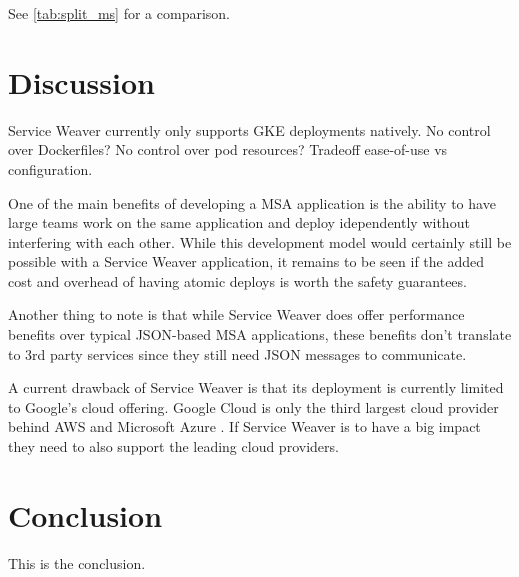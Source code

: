 \documentclass[sigconf,review,9pt]{acmart}
\begin{document}
See \ref{tab:split_ms} for a comparison.

\section{Discussion}
Service Weaver currently only supports GKE deployments natively.
No control over Dockerfiles?
No control over pod resources?
Tradeoff ease-of-use vs configuration.

One of the main benefits of developing a MSA application is the ability to
have large teams work on the same application and deploy idependently without
interfering with each other. \cite{what}
While this development model would certainly still be possible with a Service Weaver
application, it remains to be seen if the added cost and overhead of having atomic
deploys is worth the safety guarantees.

Another thing to note is that while Service Weaver does offer performance benefits
over typical JSON-based MSA applications, these benefits don't translate to 3rd party
services since they still need JSON messages to communicate.

A current drawback of Service Weaver is that its deployment is currently limited to Google's
cloud offering.
Google Cloud is only the third largest cloud provider behind AWS \cite{AmazonWebServices}
and Microsoft Azure \cite{Azure}.
If Service Weaver is to have a big impact they need to also support the leading
cloud providers.

\section{Conclusion}
This is the conclusion.



\end{document}
